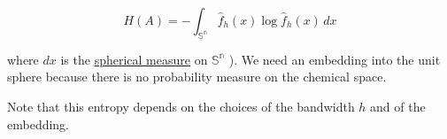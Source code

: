 \[ H(A) = -\int_\mathbb{{S}^n}  \hat{f}_h(x)\log  \hat{f}_h(x) \,dx  \]



where $dx$ is the \href{https://en.wikipedia.org/wiki/Spherical_measure}{spherical measure} on $\mathbb{{S}^n}$ ). We need an embedding into the unit sphere because there is no probability measure on the chemical space.

Note that this entropy depends on the choices of the bandwidth $h$ and of the embedding.
